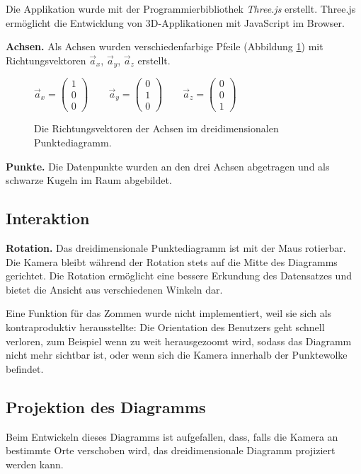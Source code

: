 Die Applikation wurde mit der Programmierbibliothek \textit{Three.js} erstellt. Three.js ermöglicht die Entwicklung von 3D-Applikationen mit JavaScript im Browser.

\textbf{Achsen.} Als Achsen wurden verschiedenfarbige Pfeile (Abbildung \ref{fig:vectors}) mit Richtungsvektoren $\vec{a}_x$, $\vec{a}_y$, $\vec{a}_z$ erstellt.

\begin{figure}[!htbp]
	\centering
	\begin{math}
		\vec{a}_x=\begin{pmatrix} 1 \\ 0 \\ 0 \end{pmatrix} \qquad
		\vec{a}_y=\begin{pmatrix} 0 \\ 1 \\ 0 \end{pmatrix} \qquad
		\vec{a}_z=\begin{pmatrix} 0 \\ 0 \\ 1 \end{pmatrix} \qquad
	\end{math}
	\caption{Die Richtungsvektoren der Achsen im dreidimensionalen Punktediagramm.}
	\label{fig:vectors}
\end{figure}

\textbf{Punkte.} Die Datenpunkte wurden an den drei Achsen abgetragen und als schwarze Kugeln im Raum abgebildet.

\subsection{Interaktion}

\textbf{Rotation.} Das dreidimensionale Punktediagramm ist mit der Maus rotierbar. Die Kamera bleibt während der Rotation stets auf die Mitte des Diagramms gerichtet. Die Rotation ermöglicht eine bessere Erkundung des Datensatzes und bietet die Ansicht aus verschiedenen Winkeln dar.

Eine Funktion für das Zommen wurde nicht implementiert, weil sie sich als kontraproduktiv herausstellte: Die Orientation des Benutzers geht schnell verloren, zum Beispiel wenn zu weit herausgezoomt wird, sodass das Diagramm nicht mehr sichtbar ist, oder wenn sich die Kamera innerhalb der Punktewolke befindet.

\subsection{Projektion des Diagramms}

Beim Entwickeln dieses Diagramms ist aufgefallen, dass, falls die Kamera an bestimmte Orte verschoben wird, das dreidimensionale Diagramm projiziert werden kann. 
